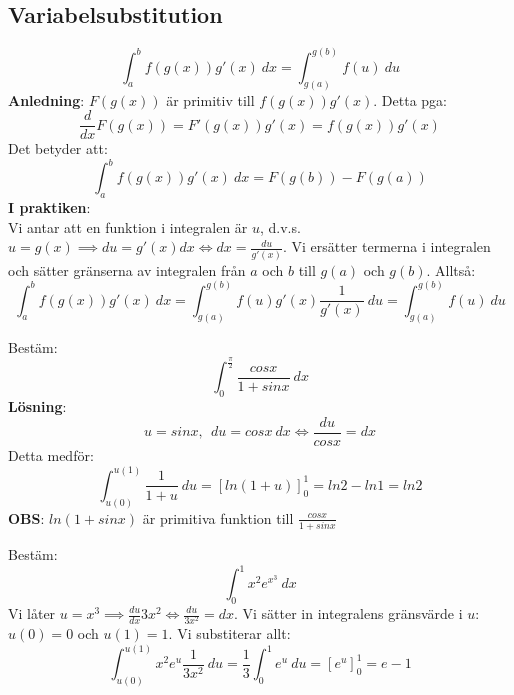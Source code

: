 \documentclass{report}
\begin{document}
\subsection{Variabelsubstitution}
{
\begin{equation*}
\int_{a}^{b} f(g(x))g'(x) \: dx = \int_{g(a)}^{g(b)} f(u) \: du  
\end{equation*}
\textbf{Anledning}: $ F(g(x)) $ är primitiv till $ f(g(x))g'(x) $. Detta pga:
\begin{equation*}
\frac{d}{dx}F(g(x)) = F'(g(x)) g'(x) = f(g(x))g'(x)
\end{equation*}
Det betyder att:
\begin{equation*}
\int_{a}^{b} f(g(x))g'(x) \: dx = F(g(b)) - F(g(a))
\end{equation*}
\textbf{I praktiken}:\\
Vi antar att en funktion i integralen är $ u $, d.v.s. $ u = g(x) \implies du = g'(x) dx \iff dx = \frac{du}{g'(x)} $. Vi ersätter termerna i integralen och sätter gränserna av integralen från $ a $ och $ b $ till $ g(a) $ och $ g(b) $. Alltså:
\begin{equation*}
\int_{a}^{b} f(g(x))g'(x) \: dx = \int_{g(a)}^{g(b)} f(u) g'(x) \frac{1}{g'(x)} \: du = \int_{g(a)}^{g(b)} f(u) \: du    
\end{equation*}
}

\ex{}
{
Bestäm:
\begin{equation*}
\int_{0}^{ \frac{\pi}{2} } \frac{cosx}{1 + sinx}  \: dx 
\end{equation*}
\textbf{Lösning}:
\begin{equation*}
u = sinx,\:\: du = cosx\:dx \iff \frac{du}{cosx} = dx
\end{equation*}
Detta medför:
\begin{equation*}
	\int_{u(0)}^{u(1)} \frac{1}{1+u}  \: du = [ ln(1+u) ]_{0}^{1} = ln2-ln1 = ln2
\end{equation*}
\textbf{OBS}: $ ln(1+sinx) $ är primitiva funktion till $ \frac{cosx}{1+sinx}  $
}

\vspace{20pt}
\qs{}
{
Bestäm:
\begin{equation*}
	\int_{0}^{1} x^2e^{x^3} \: dx 
\end{equation*}
}
\sol Vi låter $ u = x^3 \implies \frac{du}{dx} 3x^2 \iff \frac{du}{3x^2} = dx $. Vi sätter in integralens gränsvärde i $ u $: $ u(0) = 0 $ och $ u(1) = 1 $. Vi substiterar allt:
\begin{equation*}
	\int_{u(0)}^{u(1)} x^2 e^u \frac{1}{3x^2}  \: du = \frac{1}{3} \int_{0}^{1} e^u \: du = [e^u]_{0}^{1} = e-1  
\end{equation*}
\end{document}
